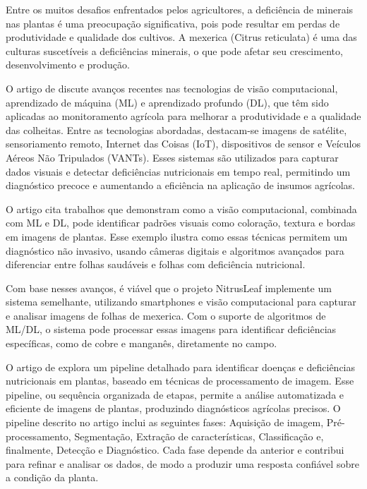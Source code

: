 Entre os muitos desafios enfrentados pelos agricultores, a deficiência de minerais nas plantas é uma preocupação significativa, pois pode resultar em perdas de produtividade e qualidade dos cultivos. A mexerica (Citrus reticulata) é uma das culturas suscetíveis a deficiências minerais, o que pode afetar seu crescimento, desenvolvimento e produção.

O artigo de \textcite{EstadoArte1} discute avanços recentes nas tecnologias de visão computacional, aprendizado de máquina (ML) e aprendizado profundo (DL), que têm sido aplicadas ao monitoramento agrícola para melhorar a produtividade e a qualidade das colheitas. Entre as tecnologias abordadas, destacam-se imagens de satélite, sensoriamento remoto, Internet das Coisas (IoT), dispositivos de sensor e Veículos Aéreos Não Tripulados (VANTs). Esses sistemas são utilizados para capturar dados visuais e detectar deficiências nutricionais em tempo real, permitindo um diagnóstico precoce e aumentando a eficiência na aplicação de insumos agrícolas.

O artigo cita trabalhos que demonstram como a visão computacional, combinada com ML e DL, pode identificar padrões visuais como coloração, textura e bordas em imagens de plantas. Esse exemplo ilustra como essas técnicas permitem um diagnóstico não invasivo, usando câmeras digitais e algoritmos avançados para diferenciar entre folhas saudáveis e folhas com deficiência nutricional.

Com base nesses avanços, é viável que o projeto NitrusLeaf implemente um sistema semelhante, utilizando smartphones e visão computacional para capturar e analisar imagens de folhas de mexerica. Com o suporte de algoritmos de ML/DL, o sistema pode processar essas imagens para identificar deficiências específicas, como de cobre e manganês, diretamente no campo.

O artigo de \cite{EstadoArte2} explora um pipeline detalhado para identificar doenças e deficiências nutricionais em plantas, baseado em técnicas de processamento de imagem. Esse pipeline, ou sequência organizada de etapas, permite a análise automatizada e eficiente de imagens de plantas, produzindo diagnósticos agrícolas precisos. O pipeline descrito no artigo inclui as seguintes fases: Aquisição de imagem, Pré-processamento, Segmentação, Extração de características, Classificação e, finalmente, Detecção e Diagnóstico. Cada fase depende da anterior e contribui para refinar e analisar os dados, de modo a produzir uma resposta confiável sobre a condição da planta.

